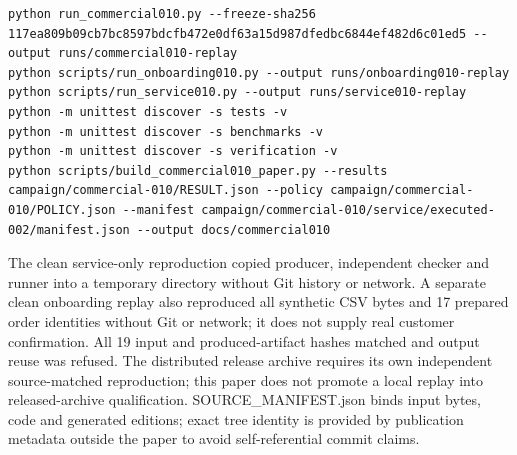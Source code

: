 \documentclass[10pt,letterpaper]{article}
\begin{document}
\begin{Verbatim}[fontsize=\scriptsize,breaklines=true]
python run_commercial010.py --freeze-sha256 117ea809b09cb7bc8597bdcfb472e0df63a15d987dfedbc6844ef482d6c01ed5 --output runs/commercial010-replay
python scripts/run_onboarding010.py --output runs/onboarding010-replay
python scripts/run_service010.py --output runs/service010-replay
python -m unittest discover -s tests -v
python -m unittest discover -s benchmarks -v
python -m unittest discover -s verification -v
python scripts/build_commercial010_paper.py --results campaign/commercial-010/RESULT.json --policy campaign/commercial-010/POLICY.json --manifest campaign/commercial-010/service/executed-002/manifest.json --output docs/commercial010
\end{Verbatim}
The clean service-only reproduction copied producer, independent checker and runner into a temporary directory without Git history or network. A separate clean onboarding replay also reproduced all synthetic CSV bytes and 17 prepared order identities without Git or network; it does not supply real customer confirmation. All 19 input and produced-artifact hashes matched and output reuse was refused. The distributed release archive requires its own independent source-matched reproduction; this paper does not promote a local replay into released-archive qualification. SOURCE\_\allowbreak{}MANIFEST.json binds input bytes, code and generated editions; exact tree identity is provided by publication metadata outside the paper to avoid self-referential commit claims.

\end{document}
